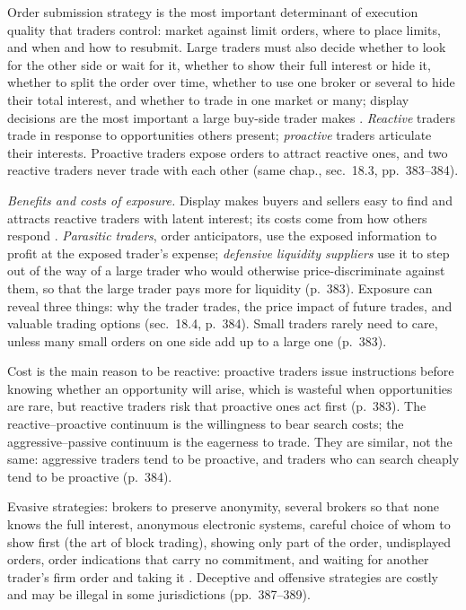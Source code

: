 \begin{qfdefinition}\label{def:order-exposure-decisions}
 Order submission strategy is the most important determinant of execution quality that traders control: market against limit orders, where to place limits, and when and how to resubmit. Large traders must also decide whether to look for the other side or wait for it, whether to show their full interest or hide it, whether to split the order over time, whether to use one broker or several to hide their total interest, and whether to trade in one market or many; display decisions are the most important a large buy-side trader makes \citep[chap.~``Buy-Side Traders'', p.~380]{alpha-harris}. \emph{Reactive} traders trade in response to opportunities others present; \emph{proactive} traders articulate their interests. Proactive traders expose orders to attract reactive ones, and two reactive traders never trade with each other (same chap., sec.~18.3, pp.~383--384).

 \emph{Benefits and costs of exposure.} Display makes buyers and sellers easy to find and attracts reactive traders with latent interest; its costs come from how others respond \citep[chap.~``Buy-Side Traders'', secs.~18.2--18.3, pp.~382--383]{alpha-harris}. \emph{Parasitic traders}, order anticipators, use the exposed information to profit at the exposed trader's expense; \emph{defensive liquidity suppliers} use it to step out of the way of a large trader who would otherwise price-discriminate against them, so that the large trader pays more for liquidity (p.~383). Exposure can reveal three things: why the trader trades, the price impact of future trades, and valuable trading options (sec.~18.4, p.~384). Small traders rarely need to care, unless many small orders on one side add up to a large one (p.~383).

Cost is the main reason to be reactive: proactive traders issue instructions before knowing whether an opportunity will arise, which is wasteful when opportunities are rare, but reactive traders risk that proactive ones act first (p.~383). The reactive--proactive continuum is the willingness to bear search costs; the aggressive--passive continuum is the eagerness to trade. They are similar, not the same: aggressive traders tend to be proactive, and traders who can search cheaply tend to be proactive (p.~384).

 Evasive strategies: brokers to preserve anonymity, several brokers so that none knows the full interest, anonymous electronic systems, careful choice of whom to show first (the art of block trading), showing only part of the order, undisplayed orders, order indications that carry no commitment, and waiting for another trader's firm order and taking it \citep[same chap., sec.~18.5.1, pp.~386--387]{alpha-harris}. Deceptive and offensive strategies are costly and may be illegal in some jurisdictions (pp.~387--389).


\end{qfdefinition}
